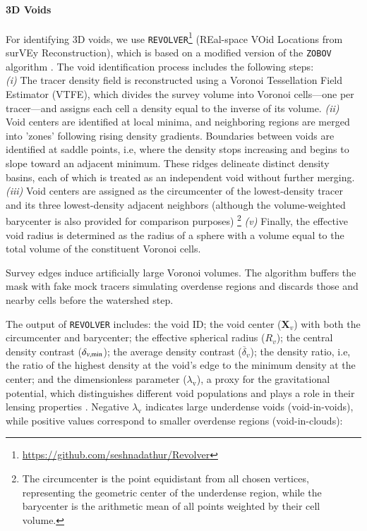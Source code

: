 \documentclass[]{aa} %
\begin{document}
\paragraph{\textbf{3D Voids}}

For identifying 3D voids, we use \texttt{REVOLVER}\footnote{\url{https://github.com/seshnadathur/Revolver}} (REal-space VOid Locations from surVEy Reconstruction), which is based on a modified version of the \texttt{ZOBOV} algorithm \citep{neyrinck2008zobov}. The void identification process includes the following steps: \\
{\it (i)} The tracer density field is reconstructed using a Voronoi Tessellation Field Estimator (VTFE), which divides the survey volume into Voronoi cells---one per tracer---and assigns each cell a density equal to the inverse of its volume. {\it (ii)} Void centers are identified at local minima, and neighboring regions are merged into 'zones' following rising density gradients. Boundaries between voids are identified at saddle points, i.e, where the density stops increasing and begins to slope toward an adjacent minimum. These ridges delineate distinct density basins, each of which is treated as an independent void without further merging. {\it (iii)} Void centers are assigned as the circumcenter of the lowest-density tracer and its three lowest-density adjacent neighbors (although the volume-weighted barycenter is also provided for comparison purposes) \footnote{The circumcenter is the point equidistant from all chosen vertices, representing the geometric center of the underdense region, while the barycenter is the arithmetic mean of all points weighted by their cell volume.} {\it (v)} Finally, the effective void radius is determined as the radius of a sphere with a volume equal to the total volume of the constituent Voronoi cells.

Survey edges induce artificially large Voronoi volumes. The algorithm buffers the mask with fake mock tracers simulating overdense regions and discards those and nearby cells before the watershed step.

The output of \texttt{REVOLVER} includes: the void ID; the void center ($\mathbf{X}_v$) with both the circumcenter and barycenter; the effective spherical radius ($R_v$); the central density contrast ($\delta_{v,\rm{min}}$); the average density contrast ($\overline\delta_v$); the  density ratio, i.e, the ratio of the highest density at the void’s edge to the minimum density at the center; and the dimensionless parameter ($\lambda_\mathrm{v}$), a proxy for the gravitational potential, which distinguishes different void populations and plays a role in their lensing properties \citep[see e.g.][]{sheth&vdweygaert2004_vsf,raghunathan2020cmbk}. Negative $\lambda_\mathrm{v}$ indicates large underdense voids (void-in-voids), while positive values correspond to smaller overdense regions (void-in-clouds):
\end{document}
